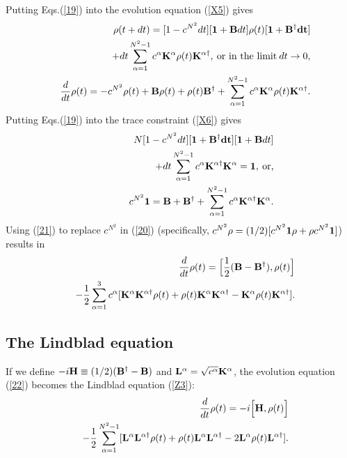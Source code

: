 \documentclass[aps,pra,twocolumn,amssymb, amsfonts,amsmath,showpacs, superscriptaddress]{revtex4}
\begin{document}
  Putting Eqs.(\ref{19}) into the evolution equation (\ref{X5}) gives
 \begin{eqnarray}\label{20}
 &&{\bf \rho}(t+dt)=[1-c^{N^{2}}dt][{\bf 1}+{\bf B}dt]{\bf\rho}(t)[{\bf 1}+{\bf B^{\dagger}dt}]\nonumber\\
  &&+ dt\sum_{\alpha=1}^{N^{2}-1}c^{\alpha}{\bf K}^{\alpha}{\bf\rho}(t){\bf K}^{\alpha\dagger}, \medspace\hbox {or in the limit}\medspace dt\rightarrow 0,\nonumber \\
  &&\frac{d}{dt}{\bf\rho}(t)=-c^{N^{2}}{\bf\rho}(t)+{\bf B}{\bf\rho}(t)+{\bf\rho}(t){\bf B^{\dagger}}+\sum_{\alpha=1}^{N^{2}-1}c^{\alpha}{\bf K}^{\alpha}{\bf\rho}(t){\bf K}^{\alpha\dagger}.\nonumber \\ 
 \end{eqnarray}
   Putting  Eqs.(\ref{19}) into the trace constraint (\ref{X6}) gives
   \begin{eqnarray}\label{21}
 &&N[1-c^{N^{2}}dt][{\bf 1}+{\bf B^{\dagger}dt][{\bf 1}+{\bf B}}dt]\nonumber\\
&&\qquad\qquad\qquad+dt\sum_{\alpha=1}^{N^{2}-1}c^{\alpha}{\bf K}^{\alpha\dagger}{\bf K}^{\alpha}={\bf 1},\medspace\hbox{or,}\nonumber\\
&&c^{N^{2}}{\bf 1}= {\bf B}+{\bf B}^{\dagger}+\sum_{\alpha=1}^{N^{2}-1}c^{\alpha}{\bf K}^{\alpha\dagger}{\bf K}^{\alpha}.
\end{eqnarray}
\noindent Using (\ref{21}) to replace $c^{N^{2}}$ in (\ref{20}) (specifically, $c^{N^{2}}\rho=(1/2)[c^{N^{2}}{\bf 1}{\bf\rho}+{\bf\rho}c^{N^{2}}{\bf 1}]$) results in 
 \begin{eqnarray}\label{22}
&&\frac{d}{dt}{\bf\rho}(t)=\Big[\frac{1}{2}({\bf B}-{\bf B}^{\dagger}), {\bf\rho}(t)\Big]\nonumber\\
&&-\frac{1}{2}\sum_{\alpha=1}^{3}c^{\alpha}[{\bf K}^{\alpha}{\bf K}^{\alpha\dagger} {\bf\rho}(t)+ {\bf\rho}(t){\bf K}^{\alpha}{\bf K}^{\alpha\dagger}-{\bf K}^{\alpha}{\bf\rho}(t){\bf K}^{\alpha\dagger}].\nonumber\\
 \end{eqnarray}
 
 \subsection{The Lindblad equation}
 
If we define $-i{\bf H}\equiv (1/2)({\bf B^{\dagger}}-{\bf B})$ and 
${\bf L}^{\alpha}=\sqrt{c^{\alpha}}\bf K^{\alpha}$,  the evolution equation (\ref{22}) becomes  the Lindblad equation (\ref{Z3}):
\begin{eqnarray}\label{23}
&&\frac{d}{dt}{\bf\rho}(t)=-i\Big[{\bf H}, {\bf\rho}(t)\Big]\nonumber\\
&&-\frac{1}{2}\sum_{\alpha=1}^{N^{2}-1}[{\bf L}^{\alpha}{\bf L}^{\alpha\dagger} {\bf\rho}(t)+ {\bf\rho}(t){\bf L}^{\alpha}{\bf L}^{\alpha\dagger}-2{\bf L}^{\alpha}{\bf\rho}(t){\bf L}^{\alpha\dagger}].\nonumber\\
 \end{eqnarray}
\end{document}

